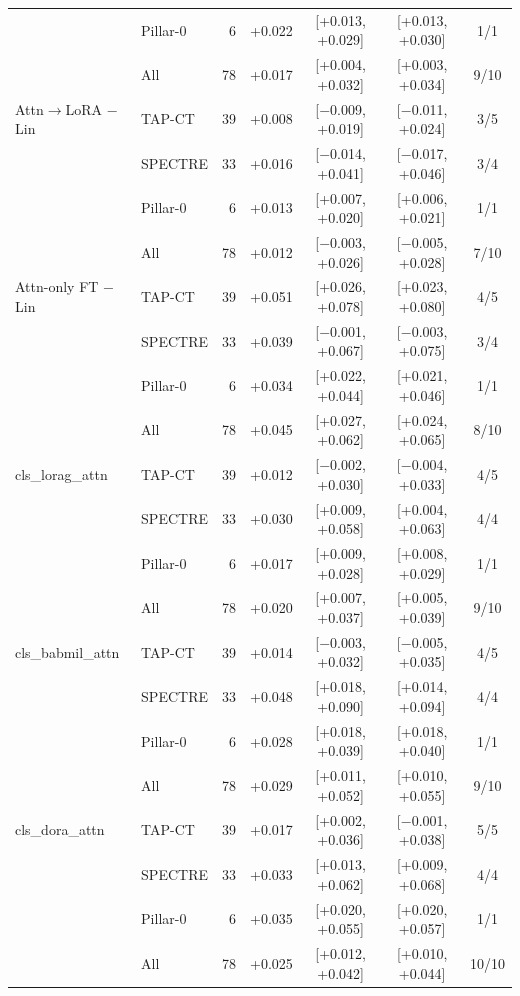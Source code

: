 \begin{tabular}{@{}llrrccc@{}}
 & Pillar-0 & 6 & +0.022 & [+0.013, +0.029] & [+0.013, +0.030] & 1/1 \\
 & All & 78 & +0.017 & [+0.004, +0.032] & [+0.003, +0.034] & 9/10 \\
\addlinespace[2pt]
Attn$\to$LoRA $-$ Lin & TAP-CT & 39 & +0.008 & [$-$0.009, +0.019] & [$-$0.011, +0.024] & 3/5 \\
 & SPECTRE & 33 & +0.016 & [$-$0.014, +0.041] & [$-$0.017, +0.046] & 3/4 \\
 & Pillar-0 & 6 & +0.013 & [+0.007, +0.020] & [+0.006, +0.021] & 1/1 \\
 & All & 78 & +0.012 & [$-$0.003, +0.026] & [$-$0.005, +0.028] & 7/10 \\
\addlinespace[2pt]
Attn-only FT $-$ Lin & TAP-CT & 39 & +0.051 & [+0.026, +0.078] & [+0.023, +0.080] & 4/5 \\
 & SPECTRE & 33 & +0.039 & [$-$0.001, +0.067] & [$-$0.003, +0.075] & 3/4 \\
 & Pillar-0 & 6 & +0.034 & [+0.022, +0.044] & [+0.021, +0.046] & 1/1 \\
 & All & 78 & +0.045 & [+0.027, +0.062] & [+0.024, +0.065] & 8/10 \\
\addlinespace[2pt]
cls\_lorag\_attn & TAP-CT & 39 & +0.012 & [$-$0.002, +0.030] & [$-$0.004, +0.033] & 4/5 \\
 & SPECTRE & 33 & +0.030 & [+0.009, +0.058] & [+0.004, +0.063] & 4/4 \\
 & Pillar-0 & 6 & +0.017 & [+0.009, +0.028] & [+0.008, +0.029] & 1/1 \\
 & All & 78 & +0.020 & [+0.007, +0.037] & [+0.005, +0.039] & 9/10 \\
\addlinespace[2pt]
cls\_babmil\_attn & TAP-CT & 39 & +0.014 & [$-$0.003, +0.032] & [$-$0.005, +0.035] & 4/5 \\
 & SPECTRE & 33 & +0.048 & [+0.018, +0.090] & [+0.014, +0.094] & 4/4 \\
 & Pillar-0 & 6 & +0.028 & [+0.018, +0.039] & [+0.018, +0.040] & 1/1 \\
 & All & 78 & +0.029 & [+0.011, +0.052] & [+0.010, +0.055] & 9/10 \\
\addlinespace[2pt]
cls\_dora\_attn & TAP-CT & 39 & +0.017 & [+0.002, +0.036] & [$-$0.001, +0.038] & 5/5 \\
 & SPECTRE & 33 & +0.033 & [+0.013, +0.062] & [+0.009, +0.068] & 4/4 \\
 & Pillar-0 & 6 & +0.035 & [+0.020, +0.055] & [+0.020, +0.057] & 1/1 \\
 & All & 78 & +0.025 & [+0.012, +0.042] & [+0.010, +0.044] & 10/10 \\

\end{tabular}
